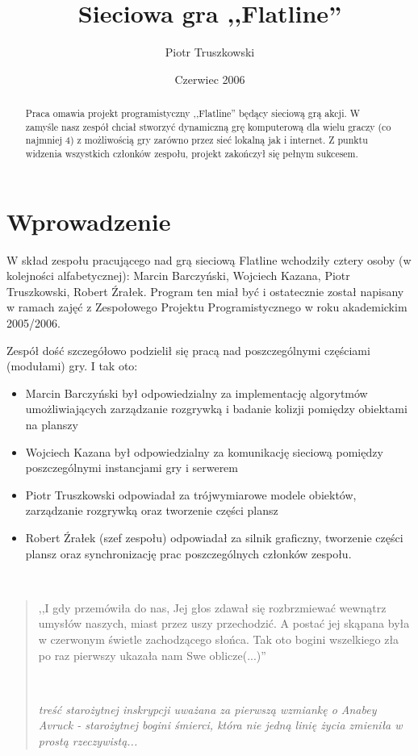\documentclass[licencjacka]{pracamgr}
\author{Piotr Truszkowski}
\title{Sieciowa gra ,,Flatline''}
\date{Czerwiec 2006}
\begin{document}
\maketitle

\begin{abstract}
  Praca omawia projekt programistyczny ,,Flatline'' będący
  sieciową grą akcji. W zamyśle nasz zespół chciał stworzyć dynamiczną
  grę komputerową dla wielu graczy (co najmniej 4) z możliwością gry
  zarówno przez sieć lokalną jak i internet. Z punktu widzenia wszystkich
  członków zespołu, projekt zakończył się pełnym sukcesem.
\end{abstract}

\tableofcontents

\chapter*{Wprowadzenie}

W skład zespołu pracującego nad grą sieciową Flatline
wchodziły cztery osoby (w kolejności alfabetycznej):
Marcin Barczyński, Wojciech Kazana, Piotr Truszkowski, Robert Źrałek.
Program ten miał być i ostatecznie został napisany w ramach
zajęć z Zespołowego Projektu Programistycznego w roku akademickim
2005/2006.

Zespół dość szczegółowo podzielił się pracą nad poszczególnymi
częściami (modułami) gry. I tak oto:
\begin{itemize}
    \item Marcin Barczyński był odpowiedzialny za implementację algorytmów
    umożliwiających zarządzanie rozgrywką i badanie kolizji pomiędzy obiektami
  na planszy
  \item Wojciech Kazana był odpowiedzialny za komunikację sieciową pomiędzy
  poszczególnymi instancjami gry i serwerem
  \item Piotr Truszkowski odpowiadał za trójwymiarowe modele obiektów,
  zarządzanie rozgrywką oraz tworzenie części plansz
  \item Robert Źrałek (szef zespołu) odpowiadał za silnik graficzny, tworzenie
  części plansz oraz synchronizację prac poszczególnych członków zespołu.
\end{itemize}

\ \

\begin{quote}

  ,,I gdy przemówiła do nas, Jej głos zdawał się rozbrzmiewać
  wewnątrz umysłów naszych, miast przez uszy przechodzić. A
  postać jej skąpana była w czerwonym świetle zachodzącego słońca.
  Tak oto bogini wszelkiego zła po raz pierwszy ukazała nam Swe oblicze(...)''

  \ \

\raggedleft\slshape treść starożytnej inskrypcji
\raggedleft\slshape uważana za pierwszą wzmiankę o Anabey Avruck - starożytnej bogini śmierci, która nie jedną linię
\raggedleft\slshape życia zmieniła w prostą rzeczywistą...
\end{quote}
\end{document}

